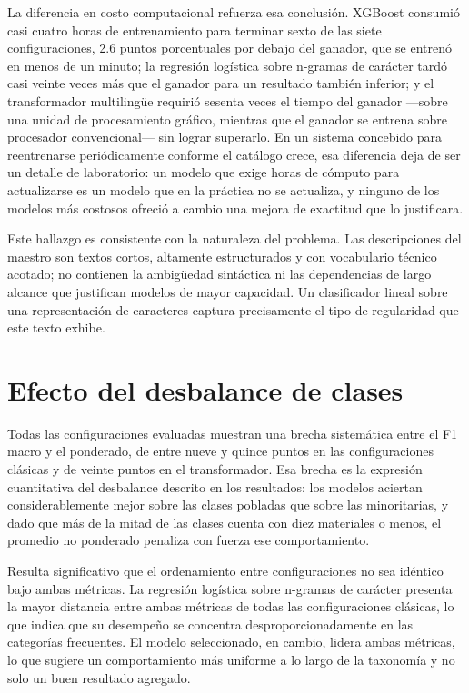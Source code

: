 La diferencia en costo computacional refuerza esa conclusión. XGBoost consumió casi cuatro horas de entrenamiento para terminar sexto de las siete configuraciones, 2.6 puntos porcentuales por debajo del ganador, que se entrenó en menos de un minuto; la regresión logística sobre n-gramas de carácter tardó casi veinte veces más que el ganador para un resultado también inferior; y el transformador multilingüe requirió sesenta veces el tiempo del ganador —sobre una unidad de procesamiento gráfico, mientras que el ganador se entrena sobre procesador convencional— sin lograr superarlo. En un sistema concebido para reentrenarse periódicamente conforme el catálogo crece, esa diferencia deja de ser un detalle de laboratorio: un modelo que exige horas de cómputo para actualizarse es un modelo que en la práctica no se actualiza, y ninguno de los modelos más costosos ofreció a cambio una mejora de exactitud que lo justificara.

Este hallazgo es consistente con la naturaleza del problema. Las descripciones del maestro son textos cortos, altamente estructurados y con vocabulario técnico acotado; no contienen la ambigüedad sintáctica ni las dependencias de largo alcance que justifican modelos de mayor capacidad. Un clasificador lineal sobre una representación de caracteres captura precisamente el tipo de regularidad que este texto exhibe.

\section{Efecto del desbalance de clases}
Todas las configuraciones evaluadas muestran una brecha sistemática entre el F1 macro y el ponderado, de entre nueve y quince puntos en las configuraciones clásicas y de veinte puntos en el transformador. Esa brecha es la expresión cuantitativa del desbalance descrito en los resultados: los modelos aciertan considerablemente mejor sobre las clases pobladas que sobre las minoritarias, y dado que más de la mitad de las clases cuenta con diez materiales o menos, el promedio no ponderado penaliza con fuerza ese comportamiento.

Resulta significativo que el ordenamiento entre configuraciones no sea idéntico bajo ambas métricas. La regresión logística sobre n-gramas de carácter presenta la mayor distancia entre ambas métricas de todas las configuraciones clásicas, lo que indica que su desempeño se concentra desproporcionadamente en las categorías frecuentes. El modelo seleccionado, en cambio, lidera ambas métricas, lo que sugiere un comportamiento más uniforme a lo largo de la taxonomía y no solo un buen resultado agregado.

